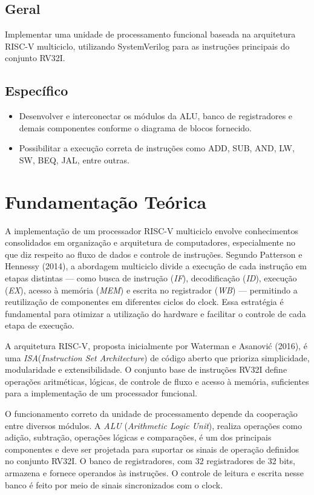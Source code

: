 \documentclass[
	12pt,				%
	openright,			%
	a4paper,			%
	english,			%
	french,				%
	spanish,			%
	brazil,				%
	]{abntex2}
\begin{document}
\section{Geral}
Implementar uma unidade de processamento funcional baseada na arquitetura RISC-V multiciclo, 
utilizando SystemVerilog para as instruções principais do conjunto RV32I.
\section{Específico}

\begin{itemize}
\item Desenvolver e interconectar os módulos da ALU, banco de registradores e demais componentes conforme o diagrama de blocos fornecido.

\item Possibilitar a execução correta de instruções como ADD, SUB, AND, LW, SW, BEQ, JAL, entre outras.

\end{itemize}

\chapter{Fundamentação Teórica}
A implementação de um processador RISC-V multiciclo envolve conhecimentos consolidados em organização e arquitetura de computadores, 
especialmente no que diz respeito ao fluxo de dados e controle de instruções. Segundo Patterson e Hennessy (2014), 
a abordagem multiciclo divide a execução de cada instrução em etapas distintas 
— como busca de instrução (\emph{IF}), decodificação (\emph{ID}), execução (\emph{EX}), acesso à memória (\emph{MEM}) e escrita no registrador (\emph{WB}) — 
permitindo a reutilização de componentes em diferentes ciclos do clock. Essa estratégia é fundamental para otimizar a utilização do hardware e facilitar o controle de cada etapa de execução.

A arquitetura RISC-V, proposta inicialmente por Waterman e Asanović (2016), é uma \emph{ISA}(\emph{Instruction Set Architecture}) de código aberto que prioriza simplicidade, modularidade e extensibilidade. 
O conjunto base de instruções RV32I define operações aritméticas, lógicas, de controle de fluxo e acesso à memória, suficientes para a implementação de um processador funcional. 

O funcionamento correto da unidade de processamento depende da cooperação entre diversos módulos. A \emph{ALU} (\emph{Arithmetic Logic Unit}), 
realiza operações como adição, subtração, operações lógicas e comparações, é um dos principais componentes e deve ser projetada para suportar os sinais de operação definidos no conjunto RV32I. 
O banco de registradores, com 32 registradores de 32 bits, armazena e fornece operandos às instruções. O controle de leitura e escrita nesse banco é feito por meio de sinais sincronizados com o clock.
\end{document}
